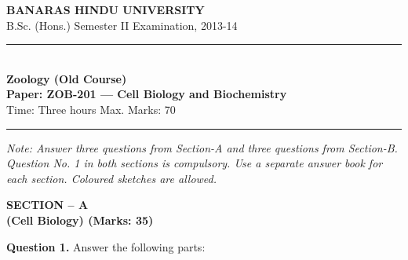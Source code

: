 \documentclass[11pt,a4paper]{article}
\begin{document}
\begin{center}
  {\large\bfseries BANARAS HINDU UNIVERSITY}\\[2pt]
  {\normalsize B.Sc. (Hons.) Semester II Examination, 2013-14}\\[6pt]
  \rule{0.8\linewidth}{0.5pt}\\[6pt]
  {\large\bfseries Zoology (Old Course)}\\[4pt]
  {\large\bfseries Paper: ZOB-201 --- Cell Biology and Biochemistry}\\[4pt]
  {\normalsize Time: Three hours \hfill Max. Marks: 70}
\end{center}

\rule{\linewidth}{0.4pt}

\smallskip



\noindent   \textit{Note: Answer three questions from Section-A and three questions from Section-B. Question No. 1 in both sections is compulsory. Use a separate answer book for each section. Coloured sketches are allowed.}

\bigskip

\begin{center}
   \textbf{SECTION -- A} \\
   \textbf{(Cell Biology) (Marks: 35)}
\end{center}

\medskip


\noindent   \textbf{Question 1.} Answer the following parts:
\end{document}

